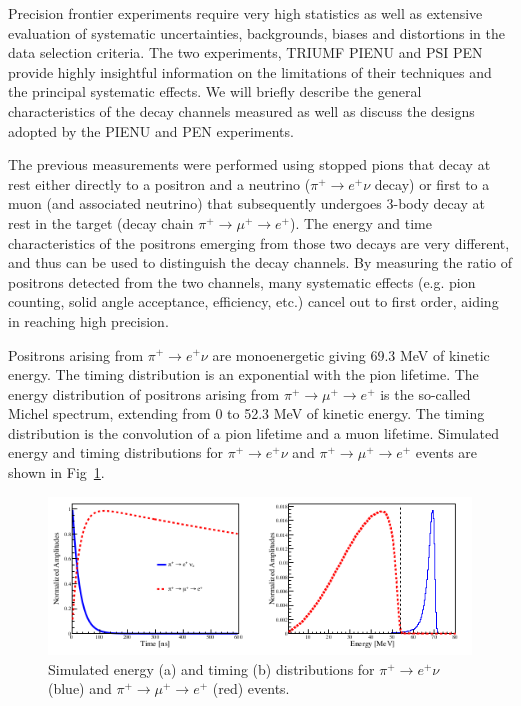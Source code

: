 Precision frontier experiments require very high statistics as well as extensive evaluation of systematic uncertainties, backgrounds, biases and distortions in the data selection criteria. The two experiments, TRIUMF PIENU and PSI PEN  provide highly insightful information on the  limitations of their techniques and the principal systematic effects. We will briefly describe the general characteristics of the decay channels measured as well as discuss the designs adopted by the PIENU and PEN experiments.

The previous measurements were performed using stopped pions that decay at rest either directly to a positron and a neutrino ($\pi^+ \rightarrow e^+ \nu$ decay) or first to a muon (and associated neutrino) that subsequently undergoes 3-body decay at rest in the target (decay chain $\pi^+ \rightarrow \mu^+ \rightarrow e^+$). The  energy and time characteristics of the positrons emerging from those two decays are very different, and thus can be used to distinguish the decay channels. By measuring the ratio of positrons detected from the two channels, many systematic effects (e.g. pion counting, solid angle acceptance, efficiency, etc.) cancel out to first order, aiding in reaching high precision.


Positrons arising from $\pi^+ \rightarrow e^+ \nu$ are monoenergetic giving  69.3 MeV of kinetic energy. The timing distribution is an exponential with the pion lifetime. 
The energy distribution of positrons arising from $\pi^+ \rightarrow \mu^+ \rightarrow e^+$ is the so-called Michel spectrum, extending from 0 to 52.3 MeV of kinetic energy. The timing distribution is the convolution of a pion lifetime and a muon lifetime. Simulated energy and timing distributions for $\pi^+ \to e^+ \nu$ and $\pi^+ \to \mu^+ \to e^+$ events are shown in Fig~\ref{fig:MC_pienu_pimue_time_energy}.

\begin{figure}[h!]
\centering
\includegraphics[scale=1.0]{sections/figures/MC_pienu_pimue_time_energy.png}
\caption{Simulated energy (a) and timing (b) distributions for $\pi^+ \to e^+ \nu$ (blue) and $\pi^+ \to \mu^+ \to e^+$ (red) events. }
\label{fig:MC_pienu_pimue_time_energy}
\end{figure}

